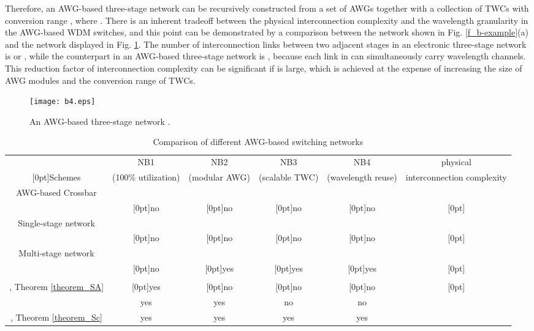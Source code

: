 \documentclass[journal]{IEEEtran}
\newcommand{\rb}[1]{\raisebox{1.2ex}[0pt]{#1}}
\begin{document}
Therefore, an  AWG-based three-stage network 
can be recursively constructed from a set of  AWGs
together with a collection of TWCs with conversion range , where
. There is an inherent tradeoff between the physical
interconnection complexity and the wavelength granularity in the
AWG-based WDM switches, and this point can be demonstrated by a
comparison between the network  shown in Fig.
\ref{f_b-example}(a) and the network  displayed in
Fig. \ref{f_b4}. The number of interconnection links between two
adjacent stages in an  electronic three-stage network is  or
, while the counterpart in an AWG-based three-stage network
 is , because each link in
 can simultaneously carry  wavelength channels.
This reduction factor  of interconnection complexity can be
significant if  is large, which is achieved at the expense of
increasing the size of AWG modules and the conversion range of TWCs.

\begin{figure}[t]
\centering
\texttt{[image: b4.eps]}
\caption{An AWG-based three-stage network .
}\label{f_b4}
\end{figure}

\begin{table*}[t]
\centering \caption{Comparison of different AWG-based switching
networks}
\begin{tabular}{||c|c|c|c|c|c||}
\hline  & NB1 & NB2 & NB3 & NB4 & physical\\
\rb{Schemes} & (100\% utilization) & (modular AWG) & (scalable TWC) & (wavelength reuse) & interconnection complexity\\
\hline AWG-based Crossbar &  &  &  &  & \\
\cite{Blumenthal:JSTQE,Bianco:TON,Cheyns:PNC2003,Pan:JLT2005,Lucerna:HPSR2011,Maier:SPIE2000} & \rb{no} & \rb{no} & \rb{no} & \rb{no} & \rb{} \\
\hline Single-stage network &  &  &  &  & \\
\cite{Pattavina:INFOCOM2006} & \rb{no} & \rb{no} & \rb{no} & \rb{no} & \rb{} \\
\hline Multi-stage network &  &  &  &  & \\
\cite{Cheyns:CM2004,Ngo:TON2006,Zanzottera:HPSR2006} & \rb{no} & \rb{yes} & \rb{yes} & \rb{yes} & \rb{} \\
\hline  &  &  &  &  & \\
\cite{Zhong:JLT1996,Leonardus:EU2007}, Theorem \ref{theorem_SA} & \rb{yes} & \rb{no} & \rb{no} & \rb{no} & \rb{} \\
\hline  & yes & yes & no & no &  \\
\hline , Theorem \ref{theorem_Sc} & yes & yes & yes & yes &  \\
\hline
\end{tabular}\label{t_comparison}
\end{table*}
\end{document}
